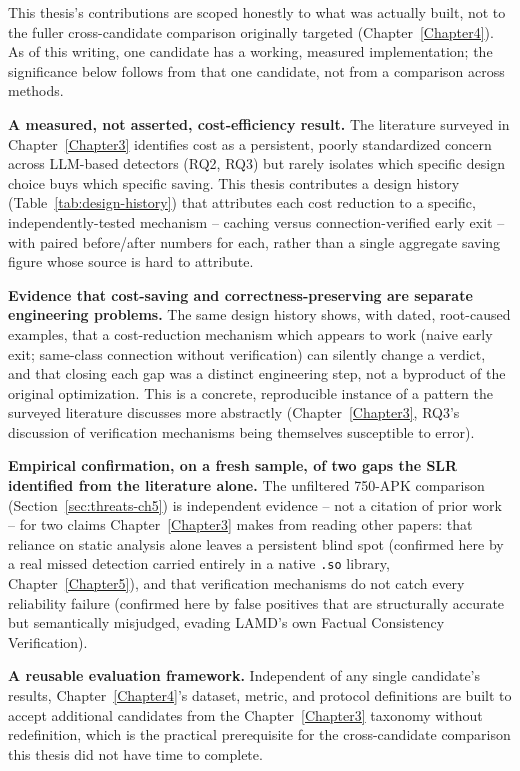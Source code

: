 This thesis's contributions are scoped honestly to what was actually built,
not to the fuller cross-candidate comparison originally targeted
(Chapter~\ref{Chapter4}). As of this writing, one
candidate has a working, measured implementation; the significance below
follows from that one candidate, not from a comparison across methods.

\textbf{A measured, not asserted, cost-efficiency result.} The literature
surveyed in Chapter~\ref{Chapter3} identifies cost as a persistent, poorly
standardized concern across LLM-based detectors (RQ2, RQ3) but rarely
isolates which specific design choice buys which specific saving. This
thesis contributes a design history (Table~\ref{tab:design-history}) that
attributes each cost reduction to a specific, independently-tested
mechanism -- caching versus connection-verified early exit -- with paired
before/after numbers for each, rather than a single aggregate saving
figure whose source is hard to attribute.

\textbf{Evidence that cost-saving and correctness-preserving are separate
engineering problems.} The same design history shows, with dated,
root-caused examples, that a cost-reduction mechanism which appears to
work (naive early exit; same-class connection without verification) can
silently change a verdict, and that closing each gap was a distinct
engineering step, not a byproduct of the original optimization. This is a
concrete, reproducible instance of a pattern the surveyed literature
discusses more abstractly (Chapter~\ref{Chapter3}, RQ3's discussion of
verification mechanisms being themselves susceptible to error).

\textbf{Empirical confirmation, on a fresh sample, of two gaps the SLR
identified from the literature alone.} The unfiltered 750-APK comparison
(Section~\ref{sec:threats-ch5}) is independent evidence -- not a citation
of prior work -- for two claims Chapter~\ref{Chapter3} makes from reading
other papers: that reliance on static analysis alone leaves a persistent
blind spot (confirmed here by a real missed detection carried entirely in
a native \texttt{.so} library, Chapter~\ref{Chapter5}), and that
verification mechanisms do not catch every reliability failure (confirmed
here by false positives that are structurally accurate but semantically
misjudged, evading LAMD's own Factual Consistency Verification).

\textbf{A reusable evaluation framework.} Independent of any single
candidate's results, Chapter~\ref{Chapter4}'s dataset, metric, and
protocol definitions are built to accept additional candidates from the
Chapter~\ref{Chapter3} taxonomy without redefinition, which is the
practical prerequisite for the cross-candidate comparison this thesis did
not have time to complete.


